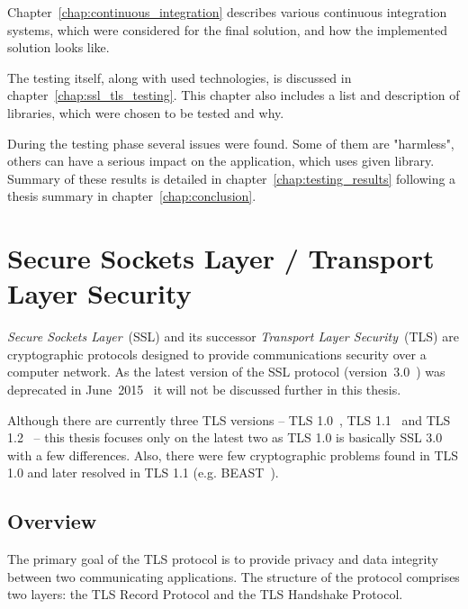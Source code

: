     Chapter~\ref{chap:continuous_integration}
    describes various continuous integration systems, which were considered
    for the final solution, and how the implemented solution looks like.

    The testing itself, along with used technologies, is discussed in
    chapter~\ref{chap:ssl_tls_testing}. This chapter also includes a list
    and description of libraries, which were chosen to be tested and why.

    During the testing phase several issues were found. Some of them are "harmless",
    others can have a serious impact on the application, which uses given library.
    Summary of these results is detailed in chapter~\ref{chap:testing_results}
    following a thesis summary in chapter~\ref{chap:conclusion}.

\chapter{Secure Sockets Layer / Transport Layer Security} \label{chap:ssl_tls}
    \textit{Secure Sockets Layer}~(SSL) and its successor
    \textit{Transport Layer Security}~(TLS) are cryptographic protocols
    designed to provide communications security over a computer network. As
    the latest version of the SSL protocol (version~3.0~\cite{rfc6101}) was
    deprecated in June~2015~\cite{rfc7568} it will not be discussed
    further in this thesis.

    Although there are currently three TLS versions -- TLS 1.0~\cite{rfc2246},
    TLS 1.1~\cite{rfc4346} and TLS 1.2~\cite{rfc5246} -- this thesis focuses
    only on the latest two as TLS 1.0 is basically SSL 3.0 with a few
    differences. Also, there were few cryptographic problems found
    in TLS 1.0 and later resolved in TLS 1.1 (e.g. BEAST~\cite{duong2011}).

\section{Overview}\label{ref:overview}
    The primary goal of the TLS protocol is to provide privacy and data
    integrity between two communicating applications. The structure of
    the protocol comprises two layers: the TLS Record Protocol and
    the TLS Handshake Protocol.

